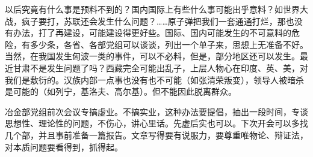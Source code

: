 以后究竟有什么事是预料不到的？国内国际上有些什么事可能出乎意料？如世界大战，疯子要打，苏联还会发生什么问题？……原子弹把我们一套通通打烂，那也没有办法，打了再建设，可能建设得更好些。国际、国内可能发生的不可意料的危险，有多少条，各省、各部党组可以谈谈，列出一个单子来，思想上无准备不好。当然，在我国发生匈波一类的事件，可以不必料，但是，部分地区还可以发生。最近甘肃不是发生问题了吗？西藏完全可能出乱子，上层人物心在印度、英、美，对我们是敷衍的。汉族内部一点事也没有也不可能（如张清荣叛变），领导人被暗杀是可能的（如列宁，基洛夫、高尔基）。但不能因此脱离群众。

冶金部党组前次会议专搞虚业。不搞实业，这种办法要提倡，抽出一段时间，专谈思想性、理论性的问题，不伤心，讲心里话。先虚后实也可以。下次开会可以多找几个部，并且事前准备一篇报告。文章写得要有说服力，要尊重唯物论、辩证法，对本质问题要看得到，抓得起。

